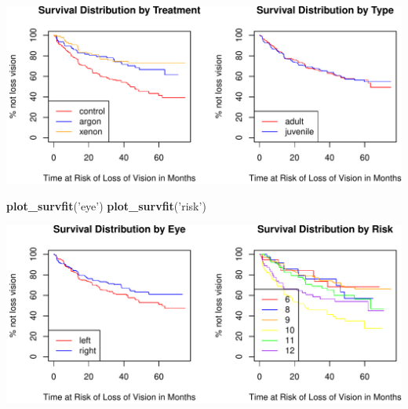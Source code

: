\documentclass[
]{article}
\newenvironment{Shaded}{\begin{snugshade}}{\end{snugshade}}
\newcommand{\KeywordTok}[1]{\textcolor[rgb]{0.13,0.29,0.53}{\textbf{#1}}}
\newcommand{\NormalTok}[1]{#1}
\newcommand{\StringTok}[1]{\textcolor[rgb]{0.31,0.60,0.02}{#1}}
\begin{document}
\includegraphics{stats504_hw2_files/figure-latex/unnamed-chunk-7-1.pdf}

\begin{Shaded}
\begin{Highlighting}[]
\KeywordTok{plot_survfit}\NormalTok{(}\StringTok{'eye'}\NormalTok{)}
\KeywordTok{plot_survfit}\NormalTok{(}\StringTok{'risk'}\NormalTok{)}
\end{Highlighting}
\end{Shaded}

\includegraphics{stats504_hw2_files/figure-latex/unnamed-chunk-7-2.pdf}
\end{document}
